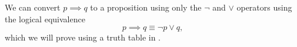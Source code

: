 We can convert $p\implies q$ to a proposition using only the $\neg$ and $\lor$ operators using the logical equivalence
\begin{equation}
  p \implies q \equiv \neg p \lor q,
\end{equation}
which we will prove using a truth table in .
\begin{table}[H]
  \centering
  \caption{A proof of \(p \implies q \equiv \neg p \lor q\).}
  \label{tab:conditionalproof}
\end{table}
